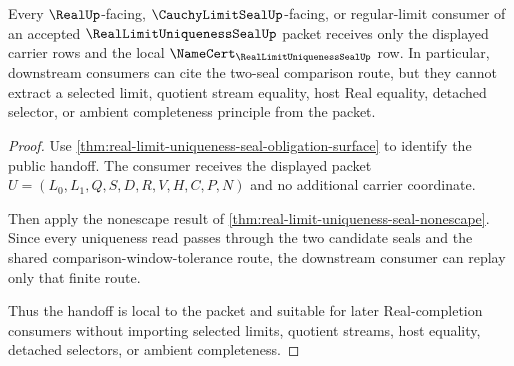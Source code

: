 \begin{theorem}
\label{thm:real-limit-uniqueness-seal-consumer-handoff}
Every $\RealUp$-facing, $\CauchyLimitSealUp$-facing, or regular-limit consumer of an accepted $\RealLimitUniquenessSealUp$ packet receives only the displayed carrier rows and the local $\NameCert_{\RealLimitUniquenessSealUp}$ row. In particular, downstream consumers can cite the two-seal comparison route, but they cannot extract a selected limit, quotient stream equality, host Real equality, detached selector, or ambient completeness principle from the packet.
\end{theorem}
\begin{proof}
Use \autoref{thm:real-limit-uniqueness-seal-obligation-surface} to identify the public handoff. The consumer receives the displayed packet $U=(L_0,L_1,Q,S,D,R,V,H,C,P,N)$ and no additional carrier coordinate.

Then apply the nonescape result of \autoref{thm:real-limit-uniqueness-seal-nonescape}. Since every uniqueness read passes through the two candidate seals and the shared comparison-window-tolerance route, the downstream consumer can replay only that finite route.

Thus the handoff is local to the packet and suitable for later Real-completion consumers without importing selected limits, quotient streams, host equality, detached selectors, or ambient completeness.
\end{proof}

